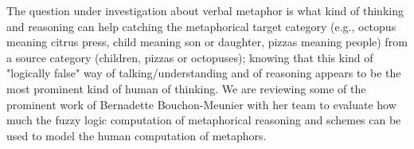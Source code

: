 The question under investigation about verbal metaphor is what kind of thinking and reasoning can help catching the metaphorical target category (e.g., octopus meaning citrus press,  child meaning son or daughter,  pizzas meaning people) from a source category (children, pizzas or octopuses); knowing that this kind of "logically false" way of talking/understanding and of reasoning appears to be the most prominent kind of human of thinking. We are reviewing some of the prominent work of Bernadette Bouchon-Meunier with her team to evaluate how much the fuzzy logic computation of metaphorical reasoning and schemes can be used to model the human computation of metaphors.



